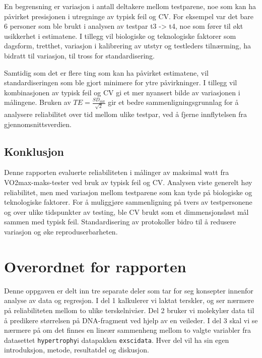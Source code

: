 \documentclass[
  letterpaper,
  DIV=11,
  numbers=noendperiod]{scrreprt}
\begin{document}
En begrensning er variasjon i antall deltakere mellom testparene, noe
som kan ha påvirket presisjonen i utregninge av typisk feil og CV. For
eksempel var det bare 6 personer som ble brukt i analysen av testpar t3
-\textgreater{} t4, noe som fører til økt usikkerhet i estimatene. I
tillegg vil biologiske og teknologiske faktorer som dagsform, tretthet,
variasjon i kalibrering av utstyr og testleders tilnærming, ha bidratt
til variasjon, til tross for standardisering.

Samtidig som det er flere ting som kan ha påvirket estimatene, vil
standardiseringen som ble gjort minimere for ytre påvirkninger. I
tillegg vil kombinasjonen av typisk feil og CV gi et mer nyansert bilde
av variasjonen i målingene. Bruken av
\(TE = \frac{SD_{\text{diff}}}{\sqrt{2}}\) gir et bedre
sammenligningsgrunnlag for å analysere reliabilitet over tid mellom
ulike testpar, ved å fjerne innflytelsen fra gjennomsnittsverdien.

\section{Konklusjon}\label{konklusjon}

Denne rapporten evaluerte reliabiliteten i målinger av maksimal watt fra
VO2max-maks-tester ved bruk av typisk feil og CV. Analysen viste
generelt høy reliabilitet, men med variasjon mellom testparene som kan
tyde på biologiske og teknologiske faktorer. For å muliggjøre
sammenligning på tvers av testpersonene og over ulike tidspunkter av
testing, ble CV brukt som et dimmensjonsløst mål sammen med typisk feil.
Standardisering av protokoller bidro til å redusere variasjon og øke
reproduserbarheten.


\chapter{Overordnet for rapporten}\label{overordnet-for-rapporten}

Denne oppgaven er delt inn tre separate deler som tar for seg konsepter
innenfor analyse av data og regresjon. I del 1 kalkulerer vi laktat
terskler, og ser nærmere på reliabiliteten mellom to ulike
terskelnivåer. Del 2 bruker vi molekylær data til å predikere størrelsen
på DNA-fragment ved hjelp av en veileder. I del 3 skal vi se nærmere på
om det finnes en lineær sammenheng mellom to valgte variabler fra
datasettet \texttt{hypertrophy}i datapakken \texttt{exscidata}. Hver del
vil ha sin egen introduksjon, metode, resultatdel og diskusjon.
\end{document}
